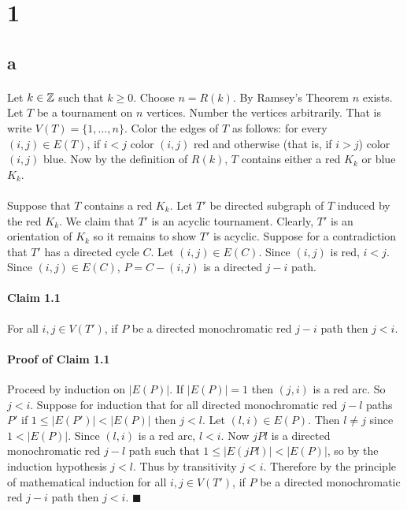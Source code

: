 \documentclass[letterpaper,12pt,oneside,onecolumn]{article}
\begin{document}
\section*{1}
\subsection*{a}
\paragraph{}
Let $k \in \mathbb{Z}$ such that $k \geq 0$. Choose $n = R(k)$. By Ramsey's Theorem $n$ exists. Let $T$ be a tournament on $n$ vertices. Number the vertices arbitrarily. That is write $V(T) = \{1, \dots, n\}$. Color the edges of $T$ as follows: for every $(i,j) \in E(T)$, if $i<j$ color $(i,j)$ red and otherwise (that is, if $i>j$) color $(i,j)$ blue. Now by the definition of $R(k)$, $T$ contains either a red $K_k$ or blue $K_k$.
\paragraph{}
Suppose that $T$ contains a red $K_k$. Let $T'$ be directed subgraph of $T$ induced by the red $K_k$. We claim that $T'$ is an acyclic tournament. Clearly, $T'$ is an orientation of $K_k$ so it remains to show $T'$ is acyclic. Suppose for a contradiction that $T'$ has a directed cycle $C$. Let $(i,j) \in E(C)$. Since $(i,j)$ is red, $i < j$. Since $(i,j) \in E(C)$, $P = C -(i,j)$ is a directed $j-i$ path.
\paragraph{Claim 1.1}
For all $i,j \in V(T')$, if $P$ be a directed monochromatic red $j-i$ path then $j<i$.
\paragraph{Proof of Claim 1.1}
Proceed by induction on $|E(P)|$. If $|E(P)| = 1$ then $(j,i)$ is a red arc. So $j<i$. Suppose for induction that for all directed monochromatic red $j-l$ paths $P'$ if $1\leq |E(P')| < |E(P)|$ then $j<l$. Let $(l,i) \in E(P)$. Then $l \neq j$ since $1 < |E(P)|$. Since $(l,i)$ is a red arc, $l<i$. Now $jPl$ is a directed monochromatic red $j-l$ path such that $1\leq |E(jPl)| < |E(P)|$, so by the induction hypothesis $j<l$. Thus by transitivity $j < i$. Therefore by the principle of mathematical induction for all $i,j \in V(T')$, if $P$ be a directed monochromatic red $j-i$ path then $j<i$. $\blacksquare$
\end{document}
